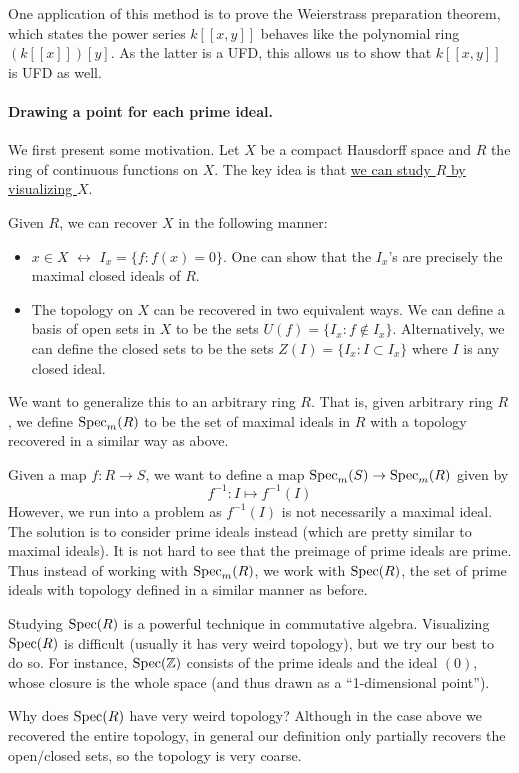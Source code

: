 One application of this method is to prove the Weierstrass preparation theorem, which states the power series $k[[x,y]]$ behaves like the polynomial ring $(k[[x]])[y]$. As the latter is a UFD, this allows us to show that $k[[x,y]]$ is UFD as well.

\paragraph{Drawing a point for each prime ideal.} We first present some motivation. Let $X$ be a compact Hausdorff space and $R$ the ring of continuous functions on $X$. The key idea is that \underline{we can study $R$ by visualizing $X$}.

Given $R$, we can recover $X$ in the following manner:
\begin{itemize}
    \item $x \in X$ $\longleftrightarrow$ $I_x = \{f : f(x) = 0\}$. One can show that the $I_x$'s are precisely the maximal closed ideals of $R$.
    \item The topology on $X$ can be recovered in two equivalent ways. We can define a basis of open sets in $X$ to be the sets $U(f) = \{I_x : f \not \in I_x\}$. Alternatively, we can define the closed sets to be the sets $Z(I) = \{I_x : I \subset I_x\}$ where $I$ is any closed ideal.
\end{itemize}
We want to generalize this to an arbitrary ring $R$. That is, given arbitrary ring $R$, we define $\operatorname{Spec}_m(R)$ to be the set of maximal ideals in $R$ with a topology recovered in a similar way as above.

Given a map $f: R \to S$, we want to define a map $\operatorname{Spec}_m(S) \to \operatorname{Spec}_m(R)$ given by
\[
    f^{-1}: I \mapsto f^{-1}(I)
\]
However, we run into a problem as $f^{-1}(I)$ is not necessarily a maximal ideal. The solution is to consider prime ideals instead (which are pretty similar to maximal ideals). It is not hard to see that the preimage of prime ideals are prime. Thus instead of working with $\operatorname{Spec}_m(R)$, we work with $\operatorname{Spec}(R)$, the set of prime ideals with topology defined in a similar manner as before.

Studying $\operatorname{Spec}(R)$ is a powerful technique in commutative algebra. Visualizing $\operatorname{Spec}(R)$ is difficult (usually it has very weird topology), but we try our best to do so. For instance, $\operatorname{Spec}({\mathbb Z})$ consists of the prime ideals and the ideal $(0)$, whose closure is the whole space (and thus drawn as a ``1-dimensional point'').

Why does $\operatorname{Spec}(R)$ have very weird topology? Although in the case above we recovered the entire topology, in general our definition only partially recovers the open/closed sets, so the topology is very coarse.


